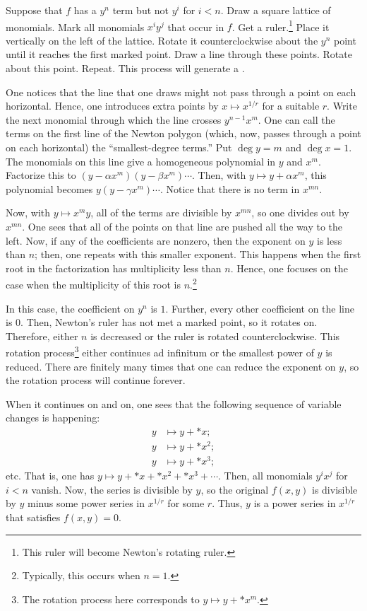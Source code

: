 \documentclass [11 pt, oneside, margin = 1 in] {article}
\begin{document}
\begin{esquisse}
	Suppose that $f$ has a $y^n$ term but not $y^i$ for $i<n$. Draw a square lattice of monomials. Mark all monomials $x^iy^j$ that occur in $f$. Get a ruler.\footnote{This ruler will become Newton's rotating ruler.} Place it vertically on the left of the lattice. Rotate it counterclockwise about the $y^n$ point until it reaches the first marked point. Draw a line through these points. Rotate about this point. Repeat. This process will generate a .

	One notices that the line that one draws might not pass through a point on each horizontal. Hence, one introduces extra points by $x\longmapsto x^{1/r}$ for a suitable $r$. Write the next monomial through which the line crosses $y^{n-1}x^m$. One can call the terms on the first line of the Newton polygon (which, now, passes through a point on each horizontal) the ``smallest-degree terms.'' Put $\deg y = m$ and $\deg x = 1$. The monomials on this line give a homogeneous polynomial in $y$ and $x^m$. Factorize this to $(y-\alpha x^m) (y-\beta x^m)\cdots$. Then, with $y\longmapsto y+\alpha x^m$, this polynomial becomes $y(y-\gamma x^m)\cdots$. Notice that there is no term in $x^{mn}$.

	Now, with $y\longmapsto x^my$, all of the terms are divisible by $x^{mn}$, so one divides out by $x^{mn}$. One sees that all of the points on that line are pushed all the way to the left. Now, if any of the coefficients are nonzero, then the exponent on $y$ is less than $n$; then, one repeats with this smaller exponent. This happens when the first root in the factorization has multiplicity less than $n$. Hence, one focuses on the case when the multiplicity of this root is $n$.\footnote{Typically, this occurs when $n=1$.}

	In this case, the coefficient on $y^n$ is $1$. Further, every other coefficient on the line is $0$. Then, Newton's ruler has not met a marked point, so it rotates on. Therefore, either $n$ is decreased or the ruler is rotated counterclockwise. This rotation process\footnote{The rotation process here corresponds to $y\longmapsto y + *x^m$.} either continues ad infinitum or the smallest power of $y$ is reduced. There are finitely many times that one can reduce the exponent on $y$, so the rotation process will continue forever.

	When it continues on and on, one sees that the following sequence of variable changes is happening:
	\begin{align*}
		y &\longmapsto y + *x;\\
		y &\longmapsto y + *x^2;\\
		y &\longmapsto y + *x^3;
	\end{align*}
	etc. That is, one has $y\longmapsto y + *x + *x^2 + *x^3 + \cdots$. Then, all monomials $y^ix^j$ for $i< n$ vanish. Now, the series is divisible by $y$, so the original $f(x,y)$ is divisible by $y$ minus some power series in $x^{1/r}$ for some $r$. Thus, $y$ is a power series in $x^{1/r}$ that satisfies $f(x,y)=0$.
\end{esquisse}
\end{document}
